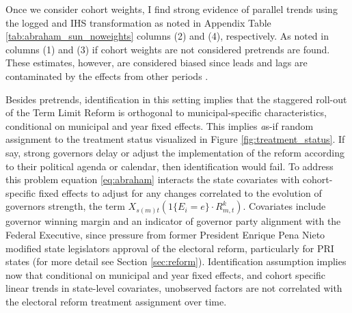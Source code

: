\documentclass[12pt]{amsart}
\numberwithin{equation}{section}
\theoremstyle{definition}
\theoremstyle{definition}
\theoremstyle{definition}
\begin{document}
Once we consider cohort weights, I find strong evidence of parallel trends using the logged and IHS transformation as noted in Appendix Table \ref{tab:abraham_sun_noweights} columns (2) and (4), respectively. As noted in columns (1) and (3) if cohort weights are not considered pretrends are found. These estimates, however, are considered biased since leads and lags are contaminated by the effects from other periods \citep{abraham_sun_2020}. 
 
Besides pretrends, identification in this setting implies that the staggered roll-out of the Term Limit Reform is orthogonal to municipal-specific characteristics, conditional on municipal and year fixed effects. This implies {\emph as-if} random assignment to the treatment status visualized in Figure \ref{fig:treatment_status}. If say, strong governors delay or adjust the implementation of the reform according to their political agenda or calendar, then identification would fail. To address this problem equation \ref{eq:abraham} interacts the state covariates with cohort-specific fixed effects to adjust for any changes correlated to the evolution of governors strength, the term $X_{s(m)t} (1\{E_i=e\} \cdot R^k_{m,t})$. Covariates include governor winning margin and an indicator of governor party alignment with the Federal Executive, since pressure from former President Enrique Pena Nieto modified state legislators approval of the electoral reform, particularly for PRI states (for more detail see Section \ref{sec:reform}). Identification assumption implies now that conditional on municipal and year fixed effects, and cohort specific linear trends in state-level covariates, unobserved factors are not correlated with the electoral reform treatment assignment over time.%
 

 
\end{document}

